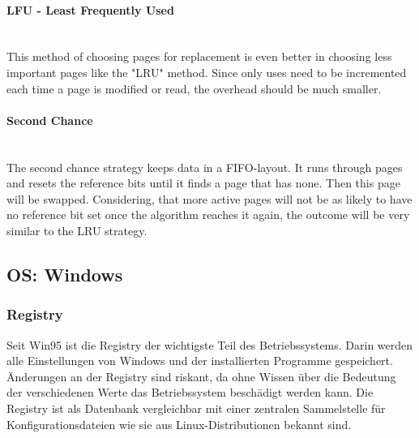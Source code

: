 \paragraph{LFU - Least Frequently Used}~\\
This method of choosing pages for replacement is even better in choosing less important pages like the "LRU" method. Since only uses need to be incremented each time a page is modified or read, the overhead should be much smaller.

\paragraph{Second Chance}~\\
The second chance strategy keeps data in a FIFO-layout. It runs through pages and resets the reference bits until it finds a page that has none. Then this page will be swapped. Considering, that more active pages will not be as likely to have no reference bit set once the algorithm reaches it again, the outcome will be very similar to the LRU strategy.

	
\subsection{OS: Windows}


\subsubsection{Registry}
Seit Win95 ist die Registry der wichtigste Teil des Betriebssystems. Darin werden alle Einstellungen von Windows und der installierten Programme gespeichert.
Änderungen an der Registry sind riskant, da ohne Wissen über die Bedeutung der verschiedenen Werte das Betriebssystem beschädigt werden kann. Die Registry ist als Datenbank vergleichbar mit einer zentralen Sammelstelle für Konfigurationsdateien wie sie aus Linux-Distributionen bekannt sind.

